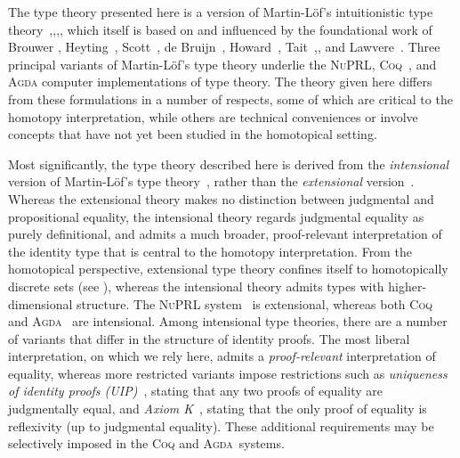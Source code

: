 \documentclass[12pt]{article}
\newcommand{\Agda}{\textsc{Agda}\xspace}
\newcommand{\Coq}{\textsc{Coq}\xspace}
\newcommand{\indexsee}[2]{\index{#1|see{#2}}}
\newcommand{\NuPRL}{\textsc{NuPRL}\xspace}
\begin{document}
The type theory presented here is a version of Martin-L\"{o}f's intuitionistic type 
theory~\cite{Martin-Lof-1972},\cite{Martin-Lof-1973},\cite{Martin-Lof-1979},\cite{martin-lof:bibliopolis}, which itself is based on and influenced 
by the foundational work of Brouwer \cite{beeson}, Heyting~\cite{heyting1966intuitionism}, Scott~\cite{scott70}, de 
Bruijn~\cite{deBruijn-1973}, Howard~\cite{howard:pat}, Tait~\cite{Tait-1966},\cite{Tait-1968}, and Lawvere~\cite{lawvere:adjinfound}.
%
Three principal variants of Martin-L\"{o}f's type theory underlie the \NuPRL \cite{constable+86nuprl-book}, \Coq~\cite{Coq}, and 
\Agda \cite{norell2007towards} computer implementations of type theory.  The theory given here differs from these formulations in a number 
of respects, some of which are critical to the homotopy interpretation, while others are technical conveniences or involve concepts that 
have not yet been studied in the homotopical setting.

%
%
%
%
Most significantly, the type theory described here is derived from the \emph{intensional} version of Martin-L\"{o}f's type 
theory~\cite{Martin-Lof-1973}, rather than the \emph{extensional} version~\cite{Martin-Lof-1979}.  Whereas the extensional theory makes no 
distinction between judgmental and propositional equality, the intensional theory regards judgmental equality as purely definitional, and 
admits a much broader, proof-relevant interpretation of the identity type that is central to the homotopy interpretation.  From the 
homotopical perspective, extensional type theory confines itself to homotopically discrete sets (see ), whereas the 
intensional theory admits types with higher-dimensional structure.  The \NuPRL system~\cite{constable+86nuprl-book} is extensional, whereas 
both \Coq~\cite{Coq} and \Agda~\cite{norell2007towards} are intensional.  Among intensional type theories, there are a number of variants 
that differ in the structure of identity proofs.  The most liberal interpretation, on which we rely here, admits a \emph{proof-relevant} 
interpretation of equality, whereas more restricted variants impose restrictions such as \emph{uniqueness of identity proofs 
  (UIP)}~\cite{Streicher93},
\indexsee{UIP}{uniqueness of identity proofs}%
%
stating that any two proofs of equality are judgmentally equal, and \emph{Axiom K}~\cite{Streicher93},
stating that 
the only proof of equality is reflexivity (up to judgmental equality).  These additional requirements may be selectively imposed in the \Coq 
and \Agda\ systems.
\end{document}
